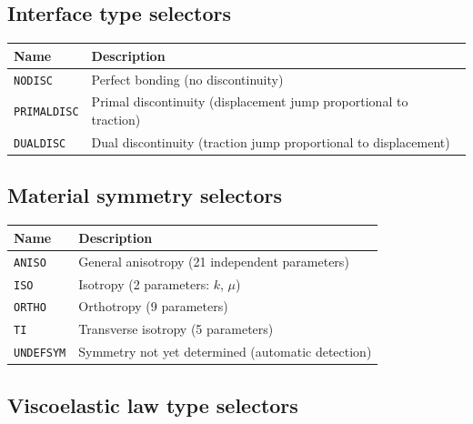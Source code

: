 \documentclass[
  a4paper,
  numbers=noendperiod,
  DIV=12]{scrreprt}
\newcounter{none} %
\begin{document}
\subsection{Interface type selectors}\label{interface-type-selectors}

{\def\LTcaptype{none} %
\begin{longtable}[]{@{}
  >{\raggedright\arraybackslash}p{}
  >{\raggedright\arraybackslash}p{}@{}}
\toprule\noalign{}
\begin{minipage}[b]{\linewidth}\raggedright
Name
\end{minipage} & \begin{minipage}[b]{\linewidth}\raggedright
Description
\end{minipage} \\
\midrule\noalign{}
\endhead
\bottomrule\noalign{}
\endlastfoot
\texttt{NODISC} & Perfect bonding (no discontinuity) \\
\texttt{PRIMALDISC} & Primal discontinuity (displacement jump
proportional to traction) \\
\texttt{DUALDISC} & Dual discontinuity (traction jump proportional to
displacement) \\
\end{longtable}
}

\subsection{Material symmetry
selectors}\label{material-symmetry-selectors}

{\def\LTcaptype{none} %
\begin{longtable}[]{@{}ll@{}}
\toprule\noalign{}
Name & Description \\
\midrule\noalign{}
\endhead
\bottomrule\noalign{}
\endlastfoot
\texttt{ANISO} & General anisotropy (21 independent parameters) \\
\texttt{ISO} & Isotropy (2 parameters: \(k\), \(\mu\)) \\
\texttt{ORTHO} & Orthotropy (9 parameters) \\
\texttt{TI} & Transverse isotropy (5 parameters) \\
\texttt{UNDEFSYM} & Symmetry not yet determined (automatic detection) \\
\end{longtable}
}

\subsection{Viscoelastic law type
selectors}\label{viscoelastic-law-type-selectors}
\end{document}
